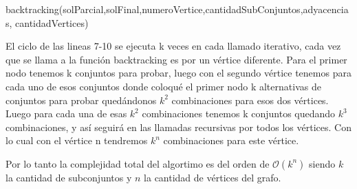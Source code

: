 \begin{algorithm}
 \begin{algorithmic}[1]\parskip=1mm
 \caption{backtracking(solParcial,solFinal,numeroVertice,cantidadSubConjuntos,adyacencias, cantidadVertices)}
  \end{algorithmic}
  \end{algorithm}

El ciclo de las lineas 7-10 se ejecuta k veces en cada llamado iterativo, cada vez que se llama a la función backtracking es por un vértice diferente. 
Para el primer nodo tenemos k conjuntos para probar, luego con el segundo vértice tenemos para cada uno de esos conjuntos donde coloqué el primer nodo k alternativas de conjuntos para probar quedándonos $k^2$ combinaciones para esos dos vértices. Luego para cada una de esas $k^2$ combinaciones tenemos k conjuntos quedando $k^3$ combinaciones, y así seguirá en las llamadas recursivas por todos los vértices. Con lo cual con el vértice n tendremos $k^n$ combinaciones para este vértice.

Por lo tanto la complejidad total del algortimo es del orden de $\mathcal{O}(k^n)$ siendo $k$ la cantidad de subconjuntos y $n$ la cantidad de vértices del grafo.

